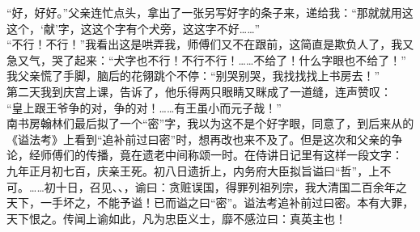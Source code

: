“好，好好。”父亲连忙点头，拿出了一张另写好字的条子来，递给我：“那就就用这这个，‘献’字，这这个字有个犬旁，这这字不好……”\\

“不行！不行！”我看出这是哄弄我，师傅们又不在跟前，这简直是欺负人了，我又急又气，哭了起来：“犬字也不行！不行不行！……不给了！什么字眼也不给了！”\\

我父亲慌了手脚，脑后的花翎跳个不停：“别哭别哭，我找找找上书房去！”\\

第二天我到庆宫上课，告诉了，他乐得两只眼睛又眯成了一道缝，连声赞叹：\\

“皇上跟王爷争的对，争的对！……有王虽小而元子哉！”\\

南书房翰林们最后拟了一个“密”字，我以为这不是个好字眼，同意了，到后来从的《谥法考》上看到“追补前过曰密”时，想再改也来不及了。但是这次和父亲的争论，经师傅们的传播，竟在遗老中间称颂一时。在侍讲日记里有这样一段文字：\\

九年正月初七百，庆亲王死。初八日遗折上，内务府大臣拟旨谥曰“哲”，上不可。……初十日，召见、、，谕曰：贪赃误国，得罪列祖列宗，我大清国二百余年之天下，一手坏之，不能予谥！已而谥之曰“密”。谥法考追补前过曰密。本有大罪，天下恨之。传闻上谕如此，凡为忠臣义士，靡不感泣曰：真英主也！
